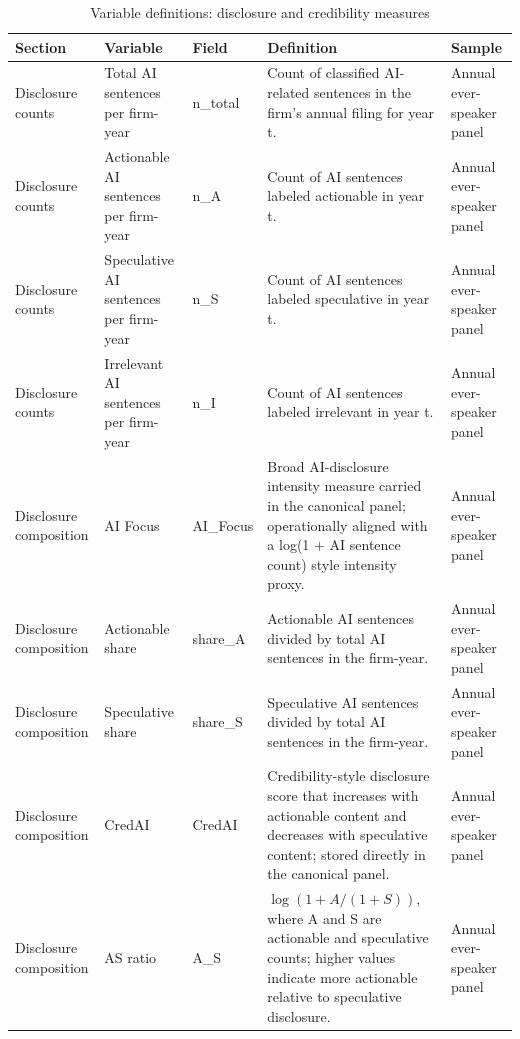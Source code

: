 
\begin{table}[p]
\centering
\scriptsize
\setlength{\tabcolsep}{2pt}
\renewcommand{\arraystretch}{1.08}
\caption{Variable definitions: disclosure and credibility measures}
\label{tab:appendix_var_defs}
\begin{tabularx}{\textwidth}{>{\raggedright\arraybackslash}p{}>{\raggedright\arraybackslash}p{}>{\raggedright\arraybackslash}p{}>{\raggedright\arraybackslash}X>{\raggedright\arraybackslash}p{}}
\hline
Section & Variable & Field & Definition & Sample \\
\hline
Disclosure counts & Total AI sentences per firm-year & n\_\allowbreak{}total & Count of classified AI-related sentences in the firm's annual filing for year t. & Annual ever-speaker panel \\
Disclosure counts & Actionable AI sentences per firm-year & n\_\allowbreak{}A & Count of AI sentences labeled actionable in year t. & Annual ever-speaker panel \\
Disclosure counts & Speculative AI sentences per firm-year & n\_\allowbreak{}S & Count of AI sentences labeled speculative in year t. & Annual ever-speaker panel \\
Disclosure counts & Irrelevant AI sentences per firm-year & n\_\allowbreak{}I & Count of AI sentences labeled irrelevant in year t. & Annual ever-speaker panel \\
Disclosure composition & AI Focus & AI\_\allowbreak{}Focus & Broad AI-disclosure intensity measure carried in the canonical panel; operationally aligned with a log(1 + AI sentence count) style intensity proxy. & Annual ever-speaker panel \\
Disclosure composition & Actionable share & share\_\allowbreak{}A & Actionable AI sentences divided by total AI sentences in the firm-year. & Annual ever-speaker panel \\
Disclosure composition & Speculative share & share\_\allowbreak{}S & Speculative AI sentences divided by total AI sentences in the firm-year. & Annual ever-speaker panel \\
Disclosure composition & CredAI & CredAI & Credibility-style disclosure score that increases with actionable content and decreases with speculative content; stored directly in the canonical panel. & Annual ever-speaker panel \\
Disclosure composition & AS ratio & A\_\allowbreak{}S & $\log(1 + A/(1+S))$, where A and S are actionable and speculative counts; higher values indicate more actionable relative to speculative disclosure. & Annual ever-speaker panel \\

\end{tabularx}
\end{table}
